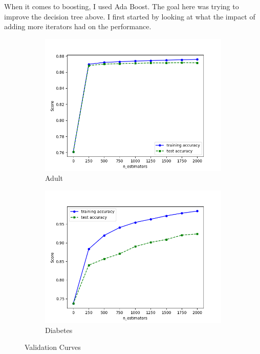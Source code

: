 \documentclass[11pt, twocolumn]{article}
\begin{document}
    When it comes to boosting, I used Ada Boost. The goal here was trying to improve the decision tree above. I first started by looking at what the impact of adding more iterators had on the performance.

    \begin{figure}[!htbp]
        \begin{subfigure}{.24\textwidth}
            \centering
            \includegraphics[width=.9\textwidth]{validations_Adult_Boosting_n_estimators}
            \caption{Adult}
            \label{fig:validations_Adult_Boosting}
        \end{subfigure}
        \begin{subfigure}{.24\textwidth}
            \centering
            \includegraphics[width=.9\textwidth]{validations_Diabetes_Boosting_n_estimators}
            \caption{Diabetes}
            \label{fig:validations_Diabetes_Boosting}
        \end{subfigure}
        \caption{Validation Curves}
    \end{figure}
    \FloatBarrier
\end{document}
